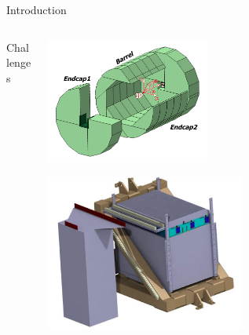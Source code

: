 \documentclass[10pt]{beamer}
\begin{document}
\begin{frame}[shrink=5]{Introduction}
\begin{columns}
\begin{column}{0.6\textwidth}
\begin{block}{\small  Challenges}
{        }
      \end{block}

    \end{column}

    \begin{column}{0.45\textwidth}
      \centerline{\includegraphics[width=0.45\textwidth]{images/IldDhcal}}
      \centerline{\includegraphics[width=0.55\textwidth]{images/DHCALProtoSchema}}
    \end{column}
  \end{columns}
\end{frame}
\end{document}
